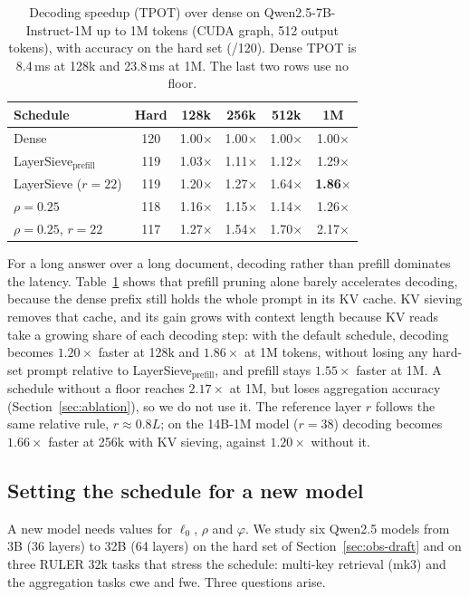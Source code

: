 \documentclass[10pt,conference]{IEEEtran}
\begin{document}
\begin{table}[t]
\centering
\caption{Decoding speedup (TPOT) over dense on Qwen2.5-7B-Instruct-1M up to 1M tokens (CUDA graph, 512 output tokens), with accuracy on the hard set (/120). Dense TPOT is 8.4\,ms at 128k and 23.8\,ms at 1M. The last two rows use no floor.}
\label{tab:decode}
\setlength{\tabcolsep}{3pt}
\small
\begin{tabular}{lccccc}
\toprule
Schedule & Hard & 128k & 256k & 512k & 1M \\
\midrule
Dense & 120 & 1.00$\times$ & 1.00$\times$ & 1.00$\times$ & 1.00$\times$ \\
LayerSieve$_{\text{prefill}}$ & 119 & 1.03$\times$ & 1.11$\times$ & 1.12$\times$ & 1.29$\times$ \\
LayerSieve ($r=22$) & 119 & 1.20$\times$ & 1.27$\times$ & 1.64$\times$ & \textbf{1.86$\times$} \\
\midrule
$\rho=0.25$ & 118 & 1.16$\times$ & 1.15$\times$ & 1.14$\times$ & 1.26$\times$ \\
$\rho=0.25$, $r=22$ & 117 & 1.27$\times$ & 1.54$\times$ & 1.70$\times$ & 2.17$\times$ \\
\bottomrule
\end{tabular}
\end{table}

For a long answer over a long document, decoding rather than prefill dominates the latency. Table~\ref{tab:decode} shows that prefill pruning alone barely accelerates decoding, because the dense prefix still holds the whole prompt in its KV cache. KV sieving removes that cache, and its gain grows with context length because KV reads take a growing share of each decoding step: with the default schedule, decoding becomes $1.20\times$ faster at 128k and $1.86\times$ at 1M tokens, without losing any hard-set prompt relative to LayerSieve$_{\text{prefill}}$, and prefill stays $1.55\times$ faster at 1M. A schedule without a floor reaches $2.17\times$ at 1M, but loses aggregation accuracy (Section~\ref{sec:ablation}), so we do not use it. The reference layer $r$ follows the same relative rule, $r\approx0.8L$; on the 14B-1M model ($r=38$) decoding becomes $1.66\times$ faster at 256k with KV sieving, against $1.20\times$ without it.

\subsection{Setting the schedule for a new model}
\label{sec:exp-start}

A new model needs values for $\ell_0$, $\rho$ and $\varphi$. We study six Qwen2.5 models from 3B (36 layers) to 32B (64 layers) on the hard set of Section~\ref{sec:obs-draft} and on three RULER 32k tasks that stress the schedule: multi-key retrieval (mk3) and the aggregation tasks cwe and fwe. Three questions arise.
\end{document}

